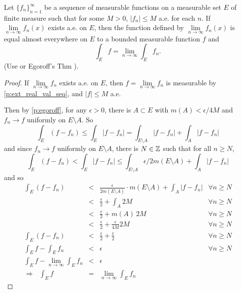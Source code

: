 \begin{pblm}\label{p:intofsequenceeqlimint}%
	Let $\{f_n\}_{n=1}^\infty$ be a sequence of measurable functions on a measurable set $E$ of 
	finite measure such that for some $M > 0$, $|f_n|\le M$ a.e. for each $n$. If 
	$\lim\limits_{n\to\infty}f_n(x)$ exists a.e. on $E$, then the function defined by 
	$\lim\limits_{n\to\infty}f_n(x)$ is equal almost everywhere on $E$ to a bounded measurable 
	function $f$ and 
	\begin{equation*}
		\int_E f = \lim\limits_{n\to\infty}\int_E f_n.
	\end{equation*}
	(Use  or Egoroff's Thm ). 
\begin{proof}
	If $\lim\limits_{n\to\infty}f_n$ exists a.e. on $E$, then $f = \lim\limits_{n\to\infty} f_n$ 
	is measurable by \ref{p:ext_real_val_seq}, and $|f| \le M$ a.e. 

	Then by \ref{p:egoroff}, for any $\epsilon > 0$, there is $A \subset E$ with $m(A) < \epsilon/4M$ and 
	$f_n \rightarrow f$ uniformly on $E \setminus A$. So 
	\begin{equation*}
		\int_E (f - f_n) \le \int_E |f - f_n| = \int_{E \setminus A} |f-f_n| + \int_A|f-f_n|
	\end{equation*}
	and since $f_n\rightarrow f$ uniformly on $E \setminus A$, there is $N \in \mathbb{Z}$ such that 
	for all $n \ge N$, 
	\begin{equation*}
		\int_E (f - f_n) < \int_E|f-f_n|\le \int_{E \setminus A} \epsilon/2m(E\setminus A) + \int_A|f-f_n|
	\end{equation*}
	and so 
	\begin{equation*}
	\begin{array}{rclr}
		 \int_E(f-f_n) & < & \frac{\epsilon}{2m(E\setminus A)} \cdot m(E\setminus A) + \int_A|f-f_n| & \forall n \ge N\\
		 & < & \frac{\epsilon}{2} + \int_A 2M & \forall n \ge N\\
		 & < & \frac{\epsilon}{2} + m(A) ~ 2M & \forall n \ge N\\
		 & < & \frac{\epsilon}{2} + \frac{\epsilon}{4M} 2M & \forall n \ge N\\
		 \int_E(f-f_n) & < & \frac{\epsilon}{2} + \frac{\epsilon}{2} & \forall n \ge N\\
		 \int_Ef-\int_Ef_n & < & \epsilon  & \forall n \ge N\\
		 \int_Ef-\lim\limits_{n\to\infty}\int_Ef_n & < & \epsilon  & \\
	\Rightarrow~~~  \int_E f & = & \lim\limits_{n\to\infty}\int_Ef_n
	\end{array}
	\end{equation*}
\end{proof}
\end{pblm}

